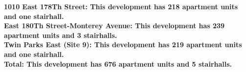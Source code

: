 \bf{1010 East 178Th Street}: This development has 218 apartment units and one stairhall.\\\bf{East 180Th Street-Monterey Avenue}: This development has 239 apartment units and 3 stairhalls.\\\bf{Twin Parks East (Site 9)}: This development has 219 apartment units and one stairhall.\\\bf{Total}: This development has 676 apartment units and 5 stairhalls.\\
